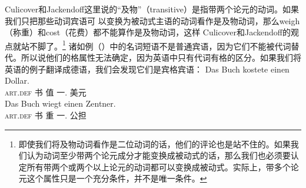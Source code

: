 Culicover和Jackendoff这里说的“及物”（transitive）是指带两个论元的动词。如果我们只把那些动词宾语可
以变换为被动式主语的动词看作是及物动词，那么weigh（称重）和cost（花费）都不能算作是及物动词，这样
Culicover和Jackendoff的观点就站不脚了。\footnote{%
即使我们将及物动词看作是二位动词的话，他们的评论也是站不住的。如果我们认为动词至少带两个论元成分才能变换成被动式的话，那么我们也必须要认定所有带两个或两个以上论元的动词都可以变换成被动式。实际上，带多个论元这个属性只是一个充分条件，并不是唯一条件。}
诸如例（）中的名词短语不是普通宾语，因为它们不能被代词替代。所以说他们的格属性无法确定，因为英语中只有代词有格的区分。如果我们将英语的例子翻译成德语，我们会发现它们是宾格宾语：
\eal
\ex 
\gll Das Buch kostete einen Dollar.\\
       \textsc{art}.\textsc{def} 书 值 一.\acc{} 美元\\
\ex 
\gll Das Buch wiegt einen Zentner.\\
     \textsc{art}.\textsc{def} 书 重 一.\acc{} 公担\\
\zl


